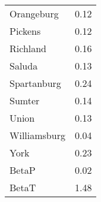 \begin{tabular}{lr}
  Orangeburg &      0.12 \\
     Pickens &      0.12 \\
    Richland &      0.16 \\
      Saluda &      0.13 \\
 Spartanburg &      0.24 \\
      Sumter &      0.14 \\
       Union &      0.13 \\
Williamsburg &      0.04 \\
        York &      0.23 \\
       BetaP &      0.02 \\
       BetaT &      1.48 \\
\bottomrule
\end{tabular}
